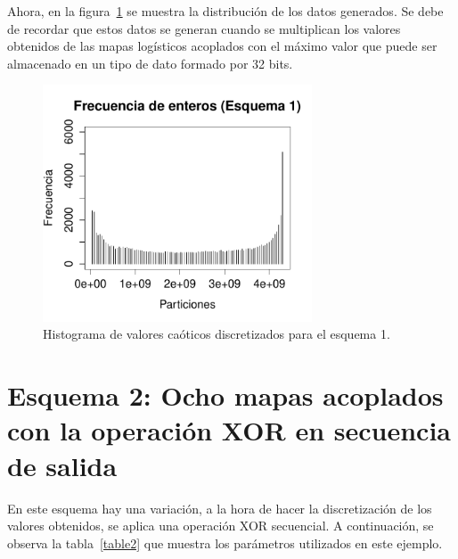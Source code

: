 \documentclass[preprint]{elsarticle}
\begin{document}
Ahora, en la figura~\ref{f2} se muestra la distribución de los datos generados. Se debe de recordar que estos datos se generan cuando se multiplican los valores obtenidos de las mapas logísticos acoplados con el máximo valor que puede ser almacenado en un tipo de dato formado por 32 bits.

\begin{figure}[H]
\centering
\includegraphics[width=8cm]{figure2.pdf}
\caption{Histograma de valores caóticos discretizados para el esquema 1.}
\label{f2}
\end{figure}



\section{Esquema 2: \textbf{Ocho mapas acoplados con la operación XOR} en secuencia de salida}
\label{esq2}

En este esquema hay una variación, a la hora de hacer la discretización de los valores obtenidos, se aplica una operación XOR secuencial. A continuación, se observa la tabla~\ref{table2} que muestra los parámetros utilizados en este ejemplo.

\begin{table}[H]
\centering
{}
\caption{Valores para cada uno de los mapas utilizados en el esquema 2.}
\label{table2}
\end{table}
\end{document}
